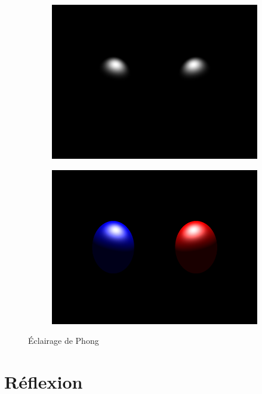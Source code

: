 \documentclass{article}
\begin{document}
\begin{figure}[hb]
  \begin{subfigure}{0.45\textwidth}
    \includegraphics[width=1\textwidth]{images/phong3.png}
  \end{subfigure}
  \begin{subfigure}{0.45\textwidth}
    \includegraphics[width=1\textwidth]{images/phong4.png}
  \end{subfigure}
  \caption{Éclairage de Phong\label{phong}}
\end{figure}


\section{Réflexion}
\end{document}
